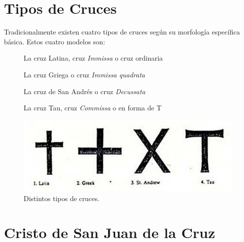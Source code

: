 
\section{Tipos de Cruces} \label{app:crosses}

Tradicionalmente existen cuatro tipos de cruces según su morfología específica básica. Estos cuatro modelos son:

\begin{description}
\item[] La cruz Latina, cruz \textit{Immissa} o cruz ordinaria
\item[] La cruz Griega o cruz \textit{Immissa quadrata}
\item[] La cruz de San Andrés o cruz \textit{Decussata}
\item[] La cruz Tau, cruz \textit{Commissa} o en forma de T
\end{description}


\begin{figure}[H]
    \centering
    \includegraphics[width=1\textwidth]{cruces.jpg}
    \caption{Distintos tipos de cruces.\cite{RefWorks:43}} %
\end{figure}

\section{Cristo de San Juan de la Cruz} \label{app:sanjuan}

